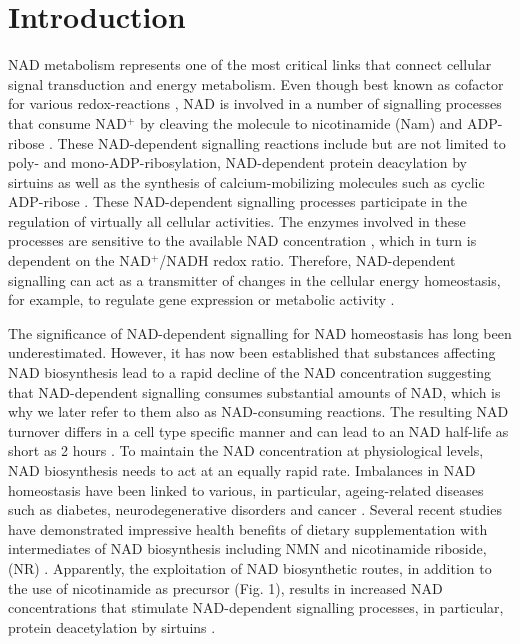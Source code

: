 
\section{Introduction}

NAD metabolism represents one of the most critical links that connect cellular signal transduction and energy metabolism. Even though best known as cofactor for various redox-reactions , NAD is involved in a number of signalling processes that consume NAD$^{+}$ by cleaving the molecule to nicotinamide (Nam) and ADP-ribose \cite{Verdin2015}. These NAD-dependent signalling reactions include but are not limited to poly- and mono-ADP-ribosylation, NAD-dependent protein deacylation by sirtuins as well as the synthesis of calcium-mobilizing molecules such as cyclic ADP-ribose \cite{?}. These NAD-dependent signalling processes participate in the regulation of virtually all cellular activities. The enzymes involved in these processes are sensitive to the available NAD concentration \cite{Ruggieri2015}, which in turn is dependent on the NAD$^{+}$/NADH redox ratio. Therefore, NAD-dependent signalling can act as a transmitter of changes in the cellular energy homeostasis, for example, to regulate gene expression or metabolic activity \cite{Koch-Nolte2009}.

The significance of NAD-dependent signalling for NAD homeostasis has long been underestimated. However, it has now been established that substances affecting NAD biosynthesis lead to a rapid decline of the NAD concentration \cite{Buonvicino2018} suggesting that NAD-dependent signalling consumes substantial amounts of NAD, which is why we later refer to them also as NAD-consuming reactions. The resulting NAD turnover differs in a cell type specific manner and can lead to an NAD half-life as short as 2 hours \cite{Liu2018}. To maintain the NAD concentration at physiological levels, NAD biosynthesis needs to act at an equally rapid rate. Imbalances in NAD homeostasis have been linked to various, in particular, ageing-related diseases such as diabetes, neurodegenerative disorders and cancer \cite{Chiarugi2012,Verdin2015}. Several recent studies have demonstrated impressive health benefits of dietary supplementation with intermediates of NAD biosynthesis including NMN and nicotinamide riboside, (NR) \cite{Yoshino2018}. Apparently, the exploitation of NAD biosynthetic routes, in addition to the use of nicotinamide as precursor (Fig. 1), results in increased NAD concentrations that stimulate NAD-dependent signalling processes, in particular, protein deacetylation by sirtuins \cite{North2004}.

